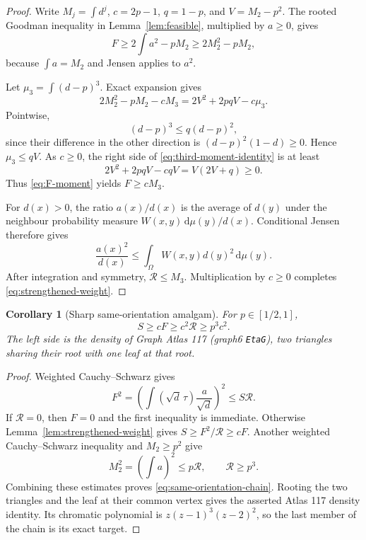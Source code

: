 \documentclass[11pt]{article}
\newtheorem{corollary}[theorem]{Corollary}
\newcommand{\dd}{\,\mathrm d}
\begin{document}
\begin{proof}
Write $M_j=\int d^j$, $c=2p-1$, $q=1-p$, and
$V=M_2-p^2$.  The rooted Goodman inequality in
Lemma~\ref{lem:feasible}, multiplied by $a\geq0$, gives
\begin{equation}
 F\geq2\int a^2-pM_2\geq2M_2^2-pM_2,
 \label{eq:F-moment}
\end{equation}
because $\int a=M_2$ and Jensen applies to $a^2$.

Let $\mu_3=\int(d-p)^3$.  Exact expansion gives
\begin{equation}
 2M_2^2-pM_2-cM_3
 =2V^2+2pqV-c\mu_3.
 \label{eq:third-moment-identity}
\end{equation}
Pointwise,
\[
 (d-p)^3\leq q(d-p)^2,
\]
since their difference in the other direction is
$(d-p)^2(1-d)\geq0$.  Hence $\mu_3\leq qV$.  As $c\geq0$, the right side of
\eqref{eq:third-moment-identity} is at least
\[
 2V^2+2pqV-cqV=V(2V+q)\geq0.
\]
Thus \eqref{eq:F-moment} yields $F\geq cM_3$.

For $d(x)>0$, the ratio $a(x)/d(x)$ is the average of $d(y)$ under the
neighbour probability measure $W(x,y)\dd\mu(y)/d(x)$.  Conditional Jensen
therefore gives
\[
 \frac{a(x)^2}{d(x)}
 \leq\int_\Omega W(x,y)d(y)^2\dd\mu(y).
\]
After integration and symmetry, $\mathcal R\leq M_3$.  Multiplication by
$c\geq0$ completes \eqref{eq:strengthened-weight}.
\end{proof}

\begin{corollary}[Sharp same-orientation amalgam]
\label{cor:same-orientation}
For $p\in[1/2,1]$,
\begin{equation}
 S\geq cF\geq c^2\mathcal R\geq p^3c^2.
 \label{eq:same-orientation-chain}
\end{equation}
The left side is the density of Graph Atlas 117 (graph6
\verb|EtaG|), two triangles sharing their root with one leaf at that root.
\end{corollary}

\begin{proof}
Weighted Cauchy--Schwarz gives
\[
 F^2
 =\left(\int (\sqrt d\,\tau)\frac a{\sqrt d}\right)^2
 \leq S\mathcal R.
\]
If $\mathcal R=0$, then $F=0$ and the first inequality is immediate.
Otherwise Lemma~\ref{lem:strengthened-weight} gives
$S\geq F^2/\mathcal R\geq cF$.
Another weighted Cauchy--Schwarz inequality and $M_2\geq p^2$ give
\[
 M_2^2=\left(\int a\right)^2\leq p\mathcal R,
 \qquad \mathcal R\geq p^3.
\]
Combining these estimates proves \eqref{eq:same-orientation-chain}.  Rooting
the two triangles and the leaf at their common vertex gives the asserted
Atlas 117 density identity.  Its chromatic polynomial is
$z(z-1)^3(z-2)^2$, so the last member of the chain is its exact target.
\end{proof}
\end{document}
